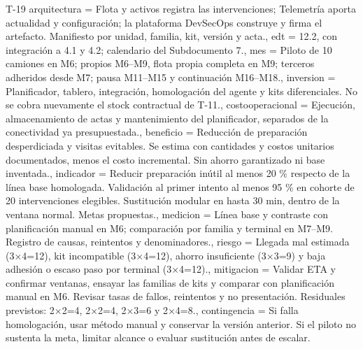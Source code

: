 \begin{formulario}{T-19}
{  arquitectura = {Flota y activos registra las intervenciones; Telemetría aporta actualidad y configuración; la plataforma DevSecOps construye y firma el artefacto. Manifiesto por unidad, familia, kit, versión y acta.},
  edt = {12.2, con integración a 4.1 y 4.2; calendario del Subdocumento 7.},
  mes = {Piloto de 10 camiones en M6; propios M6–M9, flota propia completa en M9; terceros adheridos desde M7; pausa M11–M15 y continuación M16–M18.},
  inversion = {Planificador, tablero, integración, homologación del agente y kits diferenciales. No se cobra nuevamente el stock contractual de T-11.},
  costooperacional = {Ejecución, almacenamiento de actas y mantenimiento del planificador, separados de la conectividad ya presupuestada.},
  beneficio = {Reducción de preparación desperdiciada y visitas evitables. Se estima con cantidades y costos unitarios documentados, menos el costo incremental. Sin ahorro garantizado ni base inventada.},
  indicador = {Reducir preparación inútil al menos 20 \% respecto de la línea base homologada. Validación al primer intento al menos 95 \% en cohorte de 20 intervenciones elegibles. Sustitución modular en hasta 30 min, dentro de la ventana normal. Metas propuestas.},
  medicion = {Línea base y contraste con planificación manual en M6; comparación por familia y terminal en M7–M9. Registro de causas, reintentos y denominadores.},
  riesgo = {Llegada mal estimada (3×4=12), kit incompatible (3×4=12), ahorro insuficiente (3×3=9) y baja adhesión o escaso paso por terminal (3×4=12).},
  mitigacion = {Validar ETA y confirmar ventanas, ensayar las familias de kits y comparar con planificación manual en M6. Revisar tasas de fallos, reintentos y no presentación. Residuales previstos: 2×2=4, 2×2=4, 2×3=6 y 2×4=8.},
  contingencia = {Si falla homologación, usar método manual y conservar la versión anterior. Si el piloto no sustenta la meta, limitar alcance o evaluar sustitución antes de escalar.}
}
\end{formulario}
